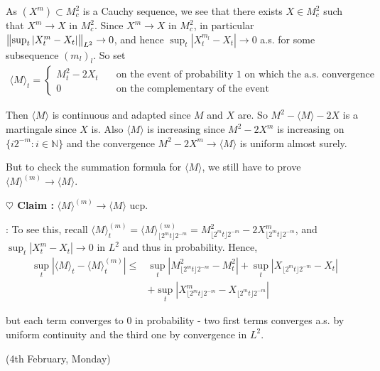 \documentclass[12pt,a4paper]{article}
\newenvironment{proof}
{\begin{changemargin}{0.5cm}{0.5cm} 
	}%
	{\end{changemargin}
}
\newenvironment{subproof}
{\begin{changemargin}{0.5cm}{0.5cm} 
	}%
	{\end{changemargin}
}
\newenvironment{p}
{\begin{proof} 
	}%
	{\end{proof}
}
\begin{document}
\begin{p}
As $(X^m) \subset M_c^2$ is a Cauchy sequence, we see that there exists $X\in M_c^2$ such that $X^m \rightarrow X$ in $M_c^2$. Since $X^m \rightarrow X$ in $M_c^2$, in particular $\bigl\lVert\sup_{t} |X_t^m -X_t| \bigr\rVert_{L^2} \rightarrow 0$, and hence $\sup_{t} |X_t^{m_l} - X_t| \rightarrow 0$ a.s. for some subsequence $(m_l)_l$. So set
\begin{align*}
\langle M \rangle_t = \begin{cases}
M_t^2 -2X_t \quad & \text{on the event of probability 1 on which the a.s. convergence holds} \\
0 \quad & \text{on the complementary of the event}
\end{cases}
\end{align*}

Then $\langle M \rangle$ is continuous and adapted since $M$ and $X$ are. So $M^2 - \langle M \rangle -2X$ is a martingale since $X$ is. Also $\langle M \rangle$ is increasing since $M^2 - 2X^m$ is increasing on $\{i2^{-m} : i\in \mathbb{N} \}$ and the convergence $M^2 -2X^m \rightarrow \langle M \rangle$ is uniform almost surely.
\s

But to check the summation formula for $\langle M \rangle$, we still have to prove $\langle M \rangle^{(m)} \rightarrow \langle M \rangle$.

\textbf{$\heartsuit$ Claim :} $\langle M \rangle^{(m)} \rightarrow \langle M \rangle$ ucp.
\begin{subproof}
: To see this, recall $\langle M \rangle_t^{(m)} = \langle M\rangle_{\lfloor 2^m t \rfloor 2^{-m}}^{(m)} = M^2_{\lfloor 2^m t\rfloor 2^{-m}} - 2X^m_{\lfloor 2^m t\rfloor 2^{-m}}$, and $\sup_{t} |X_t^m - X_t| \rightarrow 0$ in $L^2$ and thus in probability. Hence,
\begin{align*}
\sup_{t} |\langle M \rangle_t -\langle M \rangle_t^{(m)}| \leq &\sup_t |M^2_{\lfloor 2^m t\rfloor 2^{-m}} - M^2_t| + \sup_t |X_{\lfloor 2^m t\rfloor 2^{-m}} - X_t|\\
&+ \sup_t |X^m_{\lfloor 2^m t\rfloor 2^{-m}} - X_{\lfloor 2^m t\rfloor 2^{-m}}|
\end{align*}
\end{subproof}
but each term converges to 0 in probability - two first terms converges a.s. by uniform continuity and the third one by convergence in $L^2$. 

\eop 
\end{p}

\newday

(4th February, Monday)
\s
\end{document}
